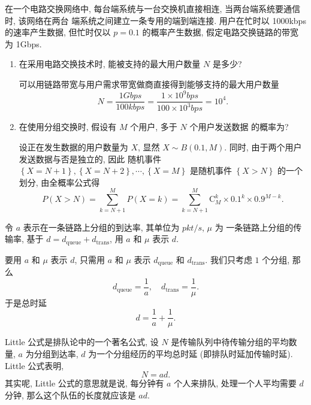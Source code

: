 \documentclass[10pt,UTF8]{book} %
\begin{document}
\begin{example}
    在一个电路交换网络中, 每台端系统与一台交换机直接相连, 当两台端系统要通信时, 该网络在两台
    端系统之间建立一条专用的端到端连接.
    用户在忙时以 1000kbps 的速率产生数据, 但忙时仅以 $p=0.1$ 的概率产生数据,
    假定电路交换链路的带宽为 1Gbps.
    \begin{enumerate}[label={$\left.\mathrm{\alph*}\right)$}, itemsep=0pt]
        \item 在采用电路交换技术时, 能被支持的最大用户数量 $N$ 是多少?
        \begin{sol}
            可以用链路带宽与用户需求带宽做商直接得到能够支持的最大用户数量
            \[ N = \dfrac{1\si{Gbps}}{100\si{kbps}}
            = \dfrac{1 \times 10^9 \si{bps}}{100 \times 10^3 \si{bps}}
            = 10^4. \]
        \end{sol}
        \item 在使用分组交换时, 假设有 $M$ 个用户, 多于 $N$ 个用户发送数据
        的概率为?
        \begin{sol}
            设正在发生数据的用户数量为 $X$, 显然 $X \sim B(0.1, M)$. 同时,
            由于两个用户发送数据与否是独立的, 因此
            随机事件 $\left\{ X=N+1 \right\},
            \left\{ X=N+2 \right\},
            \cdots,
            \left\{ X=M \right\}$
            是随机事件 $\left\{ X>N \right\}$ 的一个划分, 由全概率公式得
            \[ P(X>N) = \sum_{k=N+1}^{M} P(X=k)
            = \sum_{k=N+1}^{M} \mathrm{C}_M^k \times 0.1^k \times 0.9^{M-k}. \]
        \end{sol}
    \end{enumerate}
\end{example}

\begin{example}
    令 $a$ 表示在一条链路上分组的到达率, 其单位为 $\si{pkt/s}$, $\mu$ 为
    一条链路上分组的传输率, 基于 $d = d_\mathrm{queue} + d_\mathrm{trans}$,
    用 $a$ 和 $\mu$ 表示 $d$.
    \begin{sol}
        要用 $a$ 和 $\mu$ 表示 $d$, 只需用 $a$ 和 $\mu$ 表示
        $d_\mathrm{queue}$ 和 $d_\mathrm{trans}$. 我们只考虑 $1$ 个分组, 那么
        \[ d_\mathrm{queue} = \dfrac{1}{a}, \quad 
        d_\mathrm{trans} = \dfrac{1}{\mu}. \]
        于是总时延
        \[ d = \dfrac{1}{a} + \dfrac{1}{\mu}. \]
    \end{sol}
\end{example}

Little 公式是排队论中的一个著名公式, 设 $N$ 是传输队列中待传输分组的平均数量,
$a$ 为分组到达率, $d$ 为一个分组经历的平均总时延 (即排队时延加传输时延).
Little 公式表明,
\[ N = ad. \]
其实呢, Little 公式的意思就是说, 每分钟有 $a$ 个人来排队,
处理一个人平均需要 $d$ 分钟, 那么这个队伍的长度就应该是 $ad$.
\end{document}
